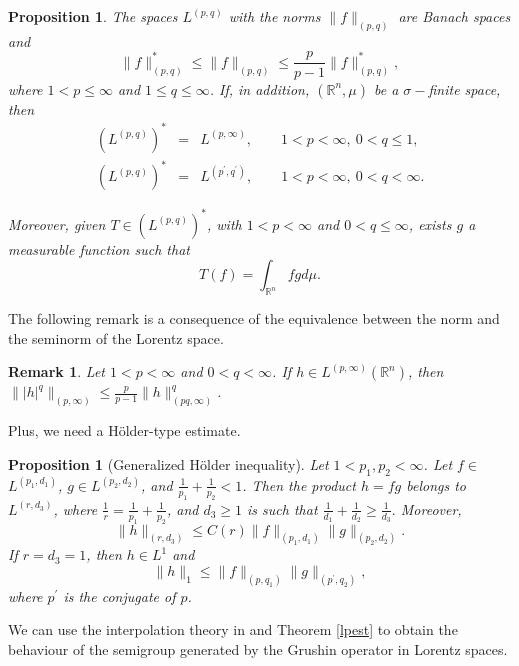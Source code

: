 \documentclass[12pt]{amsart}
\newtheorem{proposition}[theorem]{Proposition}
\newtheorem{remark}[theorem]{Remark}
\begin{document}
\begin{proposition} \label{dual}
	The spaces $L^{(p,q)}$ with the norms $\|f\|_{(p,q)}$ are Banach spaces and
	\begin{equation}\label{h}
		\|f\|^*_{(p,q)}\leq \|f\|_{(p,q)}\leq\frac{p}{p-1}\|f\|^*_{(p,q)}, 
	\end{equation}
	where $1<p\leq \infty$ and $1\leq q \leq \infty$. If, in addition, $(\mathbb{R}^n,\mu)$ be a $\sigma-$finite space, then
	\begin{eqnarray*}
		(L^{(p,q)})^{\ast}&=&L^{(p,\infty)}, \qquad 1<p<\infty, \ 0<q\leq 1,\\
		(L^{(p,q)})^{\ast}&=&L^{(p^{\prime},q^{\prime})}, \qquad 1<p<\infty, \ 0<q< \infty.
	\end{eqnarray*}
	
	\noindent Moreover, given $T\in (L^{(p,q)})^{\ast}$, with $1<p<\infty$ and $0<q\leq\infty$, exists $g$ a measurable function such that 
	\begin{equation}\label{eqdual}
		T(f)=\int_{\mathbb{R}^n}fgd{\mu}.
	\end{equation}
\end{proposition}




The following remark is a consequence of the equivalence between the norm and the seminorm of the Lorentz space.
\begin{remark}\label{ob}
	Let $1<p<\infty$ and $0<q<\infty$. If $h\in L^{(p,\infty)}(\mathbb{R}^n)$, then
	$\||h|^q\|_{(p,\infty)}\leq \frac{p}{p-1} \|h\|^q_{(pq,\infty)}$. 
\end{remark}  
Plus, we need a Hölder-type estimate.
\begin{proposition}[Generalized Hölder inequality]\label{holder}
	Let $1<p_{1}, p_{2}<\infty$. Let $f \in$
	$L^{\left(p_{1}, d_{1}\right)}$, $g \in L^{\left(p_{2}, d_{2}\right)}$, and $\frac{1}{p_{1}}+\frac{1}{p_{2}}<1$. Then the product  $h=f g$ belongs to  $L^{\left(r, d_{3}\right)}$, where $\frac{1}{r}=\frac{1}{p_{1}}+\frac{1}{p_{2}}$, and
	$d_{3} \geq 1$ is such that $\frac{1}{d_{1}}+\frac{1}{d_{2}} \geq \frac{1}{d_{3}} .$ Moreover,
	$$\|h\|_{\left(r, d_{3}\right)} \leq C(r)\|f\|_{\left(p_{1}, d_{1}\right)}\|g\|_{\left(p_{2}, d_{2}\right)}.$$
	If $r=d_3=1$, then $h\in L^1$  and
	$$\|h\|_1\leq\|f\|_{(p,q_1)}\|g\|_{(p^{\prime},q_2)},$$
	where $p^{\prime}$ is the conjugate of $p$.
\end{proposition}


We can use the interpolation theory in \cite{bergh} and Theorem \ref{lpest} to obtain the behaviour of the semigroup generated by the Grushin operator in Lorentz spaces. 
\end{document}
